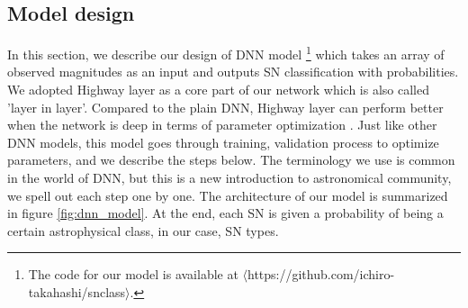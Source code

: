 \documentclass[useamsfonts]{pasj01}
\begin{document}
\subsection{Model design}
\label{sec:model} %
In this section, we describe our design of DNN model
\footnote{The code for our model is available at $\langle$https://github.com/ichiro-takahashi/snclass$\rangle$.}
which takes an array of observed magnitudes as an input and outputs SN classification with probabilities.  We adopted Highway layer \citep{srivastava15a} as a core part of our network which is also called 'layer in layer'.  Compared to the plain DNN, Highway layer can perform better when the network is deep in terms of parameter optimization \citep{srivastava15b}.   
Just like other DNN models, this model goes through training, validation process to optimize parameters, and we describe the steps below.  The terminology we use is common in the world of DNN, but this is a new introduction to astronomical community, we spell out each step one by one.  The architecture of our model is summarized in figure \ref{fig:dnn_model}.
At the end, each SN is given a probability of being a certain astrophysical class, in our case, SN types. 
%
\end{document}
